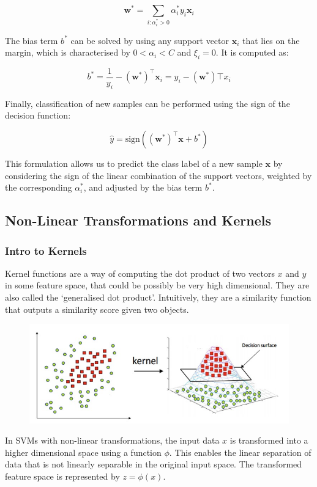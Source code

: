 \[
\mathbf{w}^* = \sum_{i:\alpha_i^*>0} \alpha_i^* y_i \mathbf{x}_i
\]

The bias term \(b^*\) can be solved by using any support vector \(\mathbf{x}_i\) that lies on the margin, which is characterised by \(0 < \alpha_i < C\) and \(\xi_i = 0\). It is computed as:

\[
b^* = \frac{1}{y_i} - (\mathbf{w}^*)^\top \mathbf{x}_i = y_i - (\mathbf{w}^*)\top x_i
\]


Finally, classification of new samples can be performed using the sign of the decision function:

\[
\hat{y} = \text{sign}((\mathbf{w}^*)^\top \mathbf{x} + b^*)
\]

This formulation allows us to predict the class label of a new sample \(\mathbf{x}\) by considering the sign of the linear combination of the support vectors, weighted by the corresponding \(\alpha_i^*\), and adjusted by the bias term \(b^*\).


\subsection{Non-Linear Transformations and Kernels}

\subsubsection*{Intro to Kernels}
Kernel functions are a way of computing the dot product of two vectors $x$ and $y$ in some feature space, that could be possibly be very high dimensional. They are also called the `generalised dot product'. Intuitively, they are a similarity function that outputs a similarity score given two objects.

\begin{figure}[H]
    \centering
\includegraphics[width=0.5\linewidth]{img/kernel.png}
    
    
\end{figure}


In SVMs with non-linear transformations, the input data \( x \) is transformed into a higher dimensional space using a function \( \phi \). This enables the linear separation of data that is not linearly separable in the original input space. The transformed feature space is represented by \( z = \phi(x) \).\\

